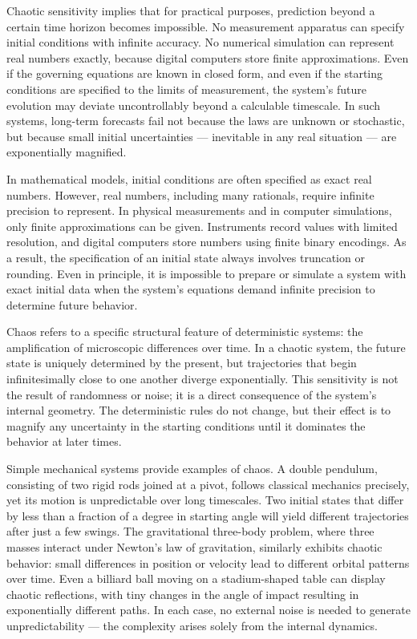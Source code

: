 Chaotic sensitivity implies that for practical purposes, prediction beyond a certain time horizon becomes impossible. No measurement apparatus can specify initial conditions with infinite accuracy. No numerical simulation can represent real numbers exactly, because digital computers store finite approximations. Even if the governing equations are known in closed form, and even if the starting conditions are specified to the limits of measurement, the system’s future evolution may deviate uncontrollably beyond a calculable timescale. In such systems, long-term forecasts fail not because the laws are unknown or stochastic, but because small initial uncertainties — inevitable in any real situation — are exponentially magnified.

In mathematical models, initial conditions are often specified as exact real numbers. However, real numbers, including many rationals, require infinite precision to represent. In physical measurements and in computer simulations, only finite approximations can be given. Instruments record values with limited resolution, and digital computers store numbers using finite binary encodings. As a result, the specification of an initial state always involves truncation or rounding. Even in principle, it is impossible to prepare or simulate a system with exact initial data when the system's equations demand infinite precision to determine future behavior.

Chaos refers to a specific structural feature of deterministic systems: the amplification of microscopic differences over time. In a chaotic system, the future state is uniquely determined by the present, but trajectories that begin infinitesimally close to one another diverge exponentially. This sensitivity is not the result of randomness or noise; it is a direct consequence of the system’s internal geometry. The deterministic rules do not change, but their effect is to magnify any uncertainty in the starting conditions until it dominates the behavior at later times.

Simple mechanical systems provide examples of chaos. A double pendulum, consisting of two rigid rods joined at a pivot, follows classical mechanics precisely, yet its motion is unpredictable over long timescales. Two initial states that differ by less than a fraction of a degree in starting angle will yield different trajectories after just a few swings. The gravitational three-body problem, where three masses interact under Newton's law of gravitation, similarly exhibits chaotic behavior: small differences in position or velocity lead to different orbital patterns over time. Even a billiard ball moving on a stadium-shaped table can display chaotic reflections, with tiny changes in the angle of impact resulting in exponentially different paths. In each case, no external noise is needed to generate unpredictability — the complexity arises solely from the internal dynamics.

